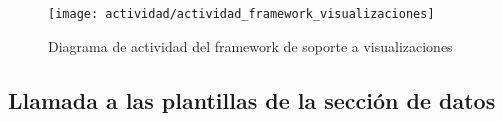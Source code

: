 \begin{figure}[h]
	\centering
	\texttt{[image: actividad/actividad\_framework\_visualizaciones]}
	\caption{Diagrama de actividad del framework de soporte a visualizaciones}
	\label{fig:diagrama_actividad_framework_soporte_visualizaciones}
\end{figure}

\subsection{Llamada a las plantillas de la sección de datos}
\label{actividad:landportal-uris_theme}